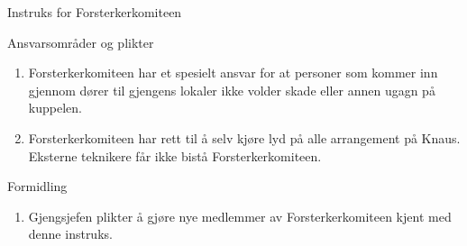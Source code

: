 \begin{instruks}{Instruks for Forsterkerkomiteen}{}{}
\begin{instruksledd}{Ansvarsområder og plikter}
\begin{enumerate}
                uke som arbeidet skal utføres. Ved telefonreparasjon og opprettelse av nye
                telefonlinjer gjelder egne frister
                satt av gjengsjefen.
            \item Forsterkerkomiteen har et spesielt ansvar for at personer som
                kommer inn gjennom dører til gjengens lokaler
                ikke volder skade eller annen ugagn på kuppelen.
            \item Forsterkerkomiteen har rett til å selv kjøre lyd på alle arrangement på
                Knaus. Eksterne teknikere får ikke
                bistå Forsterkerkomiteen.
        \end{enumerate}
    \end{instruksledd}

    \begin{instruksledd}{Formidling}
        \begin{enumerate}
            \item  Gjengsjefen plikter å gjøre nye medlemmer av Forsterkerkomiteen
                kjent med denne instruks.
        \end{enumerate}
    \end{instruksledd}


\end{instruks}
